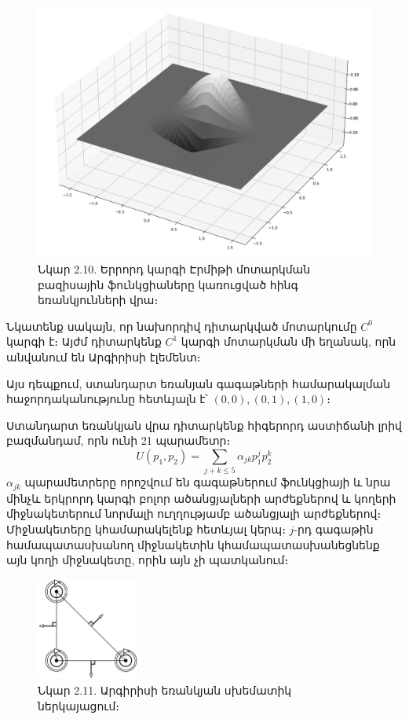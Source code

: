 \documentclass[fleqn, bachelor,subf,12pt,notitlepage]{article}
\begin{document}
\begin{figure}[H]
\begin{minipage}[b]{0.43\textwidth}
    \includegraphics[width=\textwidth]{images/hermite_cubic_fy}
  \end{minipage}
\captionsetup{labelformat=empty}
\caption{Նկար 2.10. Երրորդ կարգի Էրմիթի մոտարկման բազիսային ֆունկցիաները կառուցված հինգ եռանկյունների վրա։}
\end{figure}

Նկատենք սակայն, որ նախորդիվ դիտարկված մոտարկումը $C^{0}$ կարգի է։ Այժմ դիտարկենք $C^{1}$ կարգի մոտարկման մի եղանակ, որն անվանում են Արգիրիսի էլեմենտ։

Այս դեպքում, ստանդարտ եռանյան գագաթների համարակալման հաջորդականությունը հետևյալն է՝ $\left(0,0\right), \left(0,1\right), \left(1,0\right)$։

Ստանդարտ եռանկյան վրա դիտարկենք հիգերորդ աստիճանի լրիվ բազմանդամ, որն ունի 21 պարամետր։
\begin{equation}
				U\left(p_{1}, p_{2}\right) = \sum_{j+k\leq 5} \alpha_{jk}p_{1}^{j}p_{2}^{k}
\end{equation}
$\alpha_{jk}$ պարամետրերը որոշվում են գագաթներում ֆունկցիայի և նրա մինչև երկրորդ կարգի բոլոր ածանցյալների արժեքներով և կողերի միջնակետերում նորմալի ուղղությամբ ածանցյալի արժեքներով։ Միջնակետերը կհամարակելենք հետևյալ կերպ։ $j$-րդ գագաթին համապատասխանող միջնակետին կհամապատասխանեցնենք այն կողի միջնակետը, որին այն չի պատկանում։
\begin{figure}[H]
\centering
\includegraphics[width=0.3\textwidth]{images/argyris_element}
\captionsetup{labelformat=empty}
\caption{Նկար 2.11. Արգիրիսի եռանկյան սխեմատիկ ներկայացում։}
\end{figure}
\end{document}
